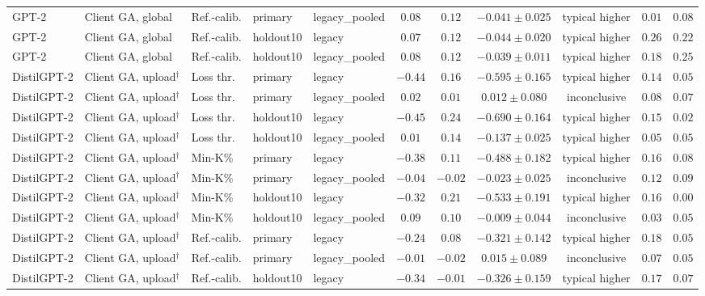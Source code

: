 {\begin{longtable}{@{\extracolsep{\fill}}lllllcccccc@{}}
GPT-2 & Client GA, global & Ref.-calib. & primary & legacy\_pooled & $0.08$ & $0.12$ & $-0.041 \pm 0.025$ & typical higher & $0.01$ & $0.08$ \\
GPT-2 & Client GA, global & Ref.-calib. & holdout10 & legacy & $0.07$ & $0.12$ & $-0.044 \pm 0.020$ & typical higher & $0.26$ & $0.22$ \\
GPT-2 & Client GA, global & Ref.-calib. & holdout10 & legacy\_pooled & $0.08$ & $0.12$ & $-0.039 \pm 0.011$ & typical higher & $0.18$ & $0.25$ \\
DistilGPT-2 & Client GA, upload$^{\dagger}$ & Loss thr. & primary & legacy & $-0.44$ & $0.16$ & $-0.595 \pm 0.165$ & typical higher & $0.14$ & $0.05$ \\
DistilGPT-2 & Client GA, upload$^{\dagger}$ & Loss thr. & primary & legacy\_pooled & $0.02$ & $0.01$ & $0.012 \pm 0.080$ & inconclusive & $0.08$ & $0.07$ \\
DistilGPT-2 & Client GA, upload$^{\dagger}$ & Loss thr. & holdout10 & legacy & $-0.45$ & $0.24$ & $-0.690 \pm 0.164$ & typical higher & $0.15$ & $0.02$ \\
DistilGPT-2 & Client GA, upload$^{\dagger}$ & Loss thr. & holdout10 & legacy\_pooled & $0.01$ & $0.14$ & $-0.137 \pm 0.025$ & typical higher & $0.05$ & $0.05$ \\
DistilGPT-2 & Client GA, upload$^{\dagger}$ & Min-K\% & primary & legacy & $-0.38$ & $0.11$ & $-0.488 \pm 0.182$ & typical higher & $0.16$ & $0.08$ \\
DistilGPT-2 & Client GA, upload$^{\dagger}$ & Min-K\% & primary & legacy\_pooled & $-0.04$ & $-0.02$ & $-0.023 \pm 0.025$ & inconclusive & $0.12$ & $0.09$ \\
DistilGPT-2 & Client GA, upload$^{\dagger}$ & Min-K\% & holdout10 & legacy & $-0.32$ & $0.21$ & $-0.533 \pm 0.191$ & typical higher & $0.16$ & $0.00$ \\
DistilGPT-2 & Client GA, upload$^{\dagger}$ & Min-K\% & holdout10 & legacy\_pooled & $0.09$ & $0.10$ & $-0.009 \pm 0.044$ & inconclusive & $0.03$ & $0.05$ \\
DistilGPT-2 & Client GA, upload$^{\dagger}$ & Ref.-calib. & primary & legacy & $-0.24$ & $0.08$ & $-0.321 \pm 0.142$ & typical higher & $0.18$ & $0.05$ \\
DistilGPT-2 & Client GA, upload$^{\dagger}$ & Ref.-calib. & primary & legacy\_pooled & $-0.01$ & $-0.02$ & $0.015 \pm 0.089$ & inconclusive & $0.07$ & $0.05$ \\
DistilGPT-2 & Client GA, upload$^{\dagger}$ & Ref.-calib. & holdout10 & legacy & $-0.34$ & $-0.01$ & $-0.326 \pm 0.159$ & typical higher & $0.17$ & $0.07$ \\

\end{longtable}}
